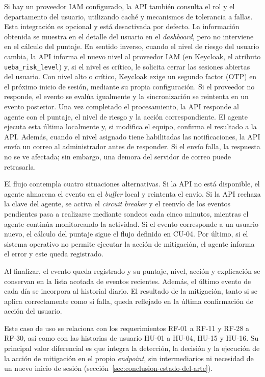 Si hay un proveedor IAM configurado, la API también consulta el rol y el departamento del usuario, utilizando caché y mecanismos de tolerancia a fallas. Esta integración es opcional y está desactivada por defecto. La información obtenida se muestra en el detalle del usuario en el \emph{dashboard}, pero no interviene en el cálculo del puntaje. En sentido inverso, cuando el nivel de riesgo del usuario cambia, la API informa el nuevo nivel al proveedor IAM (en Keycloak, el atributo \texttt{ueba\_risk\_level}) y, si el nivel es crítico, le solicita cerrar las sesiones abiertas del usuario. Con nivel alto o crítico, Keycloak exige un segundo factor (OTP) en el próximo inicio de sesión, mediante su propia configuración. Si el proveedor no responde, el evento se evalúa igualmente y la sincronización se reintenta en un evento posterior. Una vez completado el procesamiento, la API responde al agente con el puntaje, el nivel de riesgo y la acción correspondiente. El agente ejecuta esta última localmente y, si modifica el equipo, confirma el resultado a la API. Además, cuando el nivel asignado tiene habilitadas las notificaciones, la API envía un correo al administrador antes de responder. Si el envío falla, la respuesta no se ve afectada; sin embargo, una demora del servidor de correo puede retrasarla.

El flujo contempla cuatro situaciones alternativas. Si la API no está disponible, el agente almacena el evento en el \emph{buffer} local y reintenta el envío. Si la API rechaza la clave del agente, se activa el \emph{circuit breaker} y el reenvío de los eventos pendientes pasa a realizarse mediante sondeos cada cinco minutos, mientras el agente continúa monitoreando la actividad. Si el evento corresponde a un usuario nuevo, el cálculo del puntaje sigue el flujo definido en CU-04. Por último, si el sistema operativo no permite ejecutar la acción de mitigación, el agente informa el error y este queda registrado.

Al finalizar, el evento queda registrado y su puntaje, nivel, acción y explicación se conservan en la lista acotada de eventos recientes. Además, el último evento de cada día se incorpora al historial diario. El resultado de la mitigación, tanto si se aplica correctamente como si falla, queda reflejado en la última confirmación de acción del usuario.

Este caso de uso se relaciona con los requerimientos RF-01 a RF-11 y RF-28 a RF-30, así como con las historias de usuario HU-01 a HU-04, HU-15 y HU-16. Su principal valor diferencial es que integra la detección, la decisión y la ejecución de la acción de mitigación en el propio \emph{endpoint}, sin intermediarios ni necesidad de un nuevo inicio de sesión (sección~\ref{sec:conclusion-estado-del-arte}).

